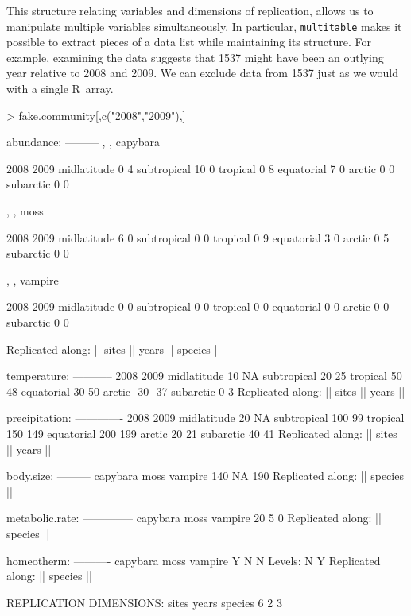 \documentclass{article}
\newcommand{\R}{{\sf R}}
\newcommand{\code}[1]{\texttt{#1}}
\numberwithin{exercise}{section}
\begin{document}
This structure relating variables and dimensions of replication, allows us to manipulate multiple variables simultaneously.  In particular, \code{multitable} makes it possible to extract pieces of a data list while maintaining its structure.  For example, examining the data suggests that 1537 might have been an outlying year relative to 2008 and 2009.  We can exclude data from 1537 just as we would with a single \R\ array.
\begin{Schunk}
\begin{Sinput}
> fake.community[,c("2008","2009"),]
\end{Sinput}
\begin{Soutput}
abundance:
---------
, , capybara

            2008 2009
midlatitude    0    4
subtropical   10    0
tropical       0    8
equatorial     7    0
arctic         0    0
subarctic      0    0

, , moss

            2008 2009
midlatitude    6    0
subtropical    0    0
tropical       0    9
equatorial     3    0
arctic         0    5
subarctic      0    0

, , vampire

            2008 2009
midlatitude    0    0
subtropical    0    0
tropical       0    0
equatorial     0    0
arctic         0    0
subarctic      0    0

Replicated along:  || sites || years || species || 


temperature:
-----------
            2008 2009
midlatitude   10   NA
subtropical   20   25
tropical      50   48
equatorial    30   50
arctic       -30  -37
subarctic      0    3
Replicated along:  || sites || years || 


precipitation:
-------------
            2008 2009
midlatitude   20   NA
subtropical  100   99
tropical     150  149
equatorial   200  199
arctic        20   21
subarctic     40   41
Replicated along:  || sites || years || 


body.size:
---------
capybara     moss  vampire 
     140       NA      190 
Replicated along:  || species || 


metabolic.rate:
--------------
capybara     moss  vampire 
      20        5        0 
Replicated along:  || species || 


homeotherm:
----------
capybara     moss  vampire 
       Y        N        N 
Levels: N Y
Replicated along:  || species || 


REPLICATION DIMENSIONS: 
  sites   years species 
      6       2       3 
\end{Soutput}
\end{Schunk}
\end{document}
